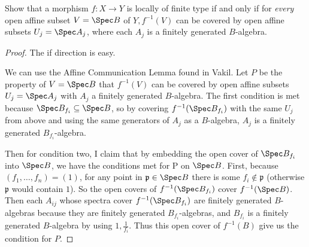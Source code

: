\begin{exercise}%
	Show that a morphism $f: X\to Y $ is locally of finite type if and only if for \textit{every} open affine subset $V = \Spec B $ of $Y, f^{-1}(V) $ can be covered by open affine subsets $U_j = \Spec A_j $, where each $A_j $ is a finitely generated $B $-algebra.
\end{exercise}
\begin{proof}
	The if direction is easy.

	We can use the Affine Communication Lemma found in Vakil.
	Let $P $ be the property of $V = \Spec B $ that $f^{-1}(V) $ can be covered by open affine subsets $U_j = \Spec A_j $ with $A_j $ a finitely generated $B $-algebra.
	The first condition is met because $\Spec B_{f_i} \subseteq \Spec B $, so by covering $f^{-1}(\Spec B_{f_i}) $ with the same $U_j $ from above and using the same generators of $A_j $ as a $B $-algebra, $A_j $ is a finitely generated $B_{f_i}$-algebra.

	Then for condition two, I claim that by embedding the open cover of $\Spec B_{f_i} $ into $\Spec B $, we have the conditions met for P on $\Spec B $.
	First, because $(f_1, \ldots , f_n) = (1) $, for any point in $\mathfrak{p} \in \Spec B $ there is some $f_i \notin \mathfrak{p}$ (otherwise $\mathfrak{p} $ would contain $1 $).
	So the open covers of $f^{-1}(\Spec B_{f_i})$ cover $f^{-1}(\Spec B) $.
	Then each $A_{ij} $ whose spectra cover $f^{-1}(\Spec B_{f_{i}}) $ are finitely generated $B $-algebras because they are finitely generated $B_{f_{i}} $-algebras, and $B_{f_{i}} $ is a finitely generated $B $-algebra by using $1, \frac{1}{f_{i}} $.
	Thus this open cover of $f^{-1}(B) $ give us the condition for $P $.
\end{proof}

